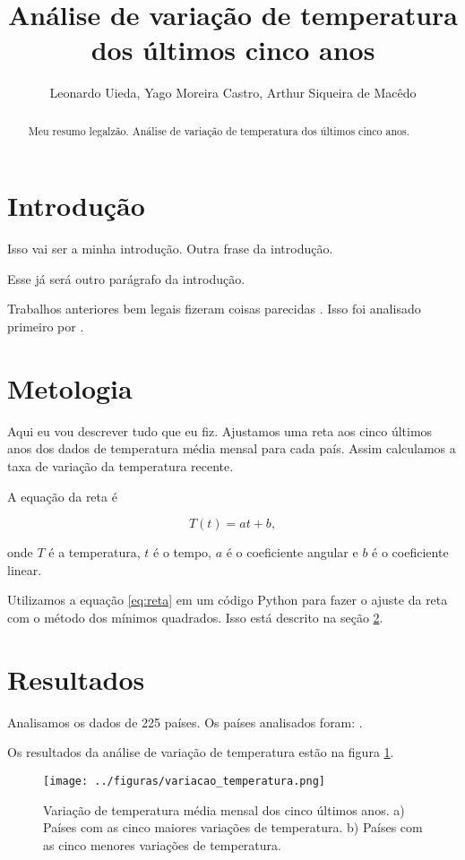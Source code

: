 \documentclass{article}
\newcommand{\Title}{Análise de variação de temperatura dos últimos cinco anos}
\begin{document}
\title{\Title}
\author{Leonardo Uieda, Yago Moreira Castro, Arthur Siqueira de Macêdo}

\maketitle

\begin{abstract}
Meu resumo legalzão. \Title.
\end{abstract}

\section{Introdução}

Isso vai ser a minha introdução.
Outra frase da introdução.

Esse já será outro parágrafo da introdução.

Trabalhos anteriores bem legais fizeram coisas parecidas
\citep{Hansen2010}.
Isso foi analisado primeiro por \citet{Hansen2010}.


\section{Metologia}
\label{sec:metodos}

Aqui eu vou descrever tudo que eu fiz.
Ajustamos uma reta aos cinco últimos anos dos dados
de temperatura média mensal para cada país.
Assim calculamos a taxa de variação da temperatura recente.

A equação da reta é

\begin{equation}
T(t) = a t + b,
\label{eq:reta}
\end{equation}

\noindent
onde $T$ é a temperatura, $t$ é o tempo, $a$ é o coeficiente angular 
e $b$ é o coeficiente linear.

Utilizamos a equação \ref{eq:reta} em um código Python para fazer o ajuste da 
reta com o método dos mínimos quadrados. 
Isso está descrito na seção \ref{sec:metodos}.

\section{Resultados}

Analisamos os dados de 225 países. 
Os países analisados foram: \Paises.

Os resultados da análise de variação de temperatura estão na figura \ref{fig:variacao}.

\begin{figure}[!tb]
    \centering
    \texttt{[image: ../figuras/variacao\_temperatura.png]}
    \caption{
        Variação de temperatura média mensal dos cinco últimos anos. 
        a) Países com as cinco maiores variações de temperatura.
        b) Países com as cinco menores variações de temperatura.
    }
    \label{fig:variacao}
\end{figure}




\end{document}
